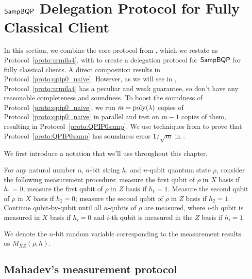\section{$\operatorname{\mathsf{SampBQP}}$ Delegation Protocol for Fully Classical Client}
\label{sec:qpip0_all}

In this section, we combine the core protocol from \cite{FOCS:Mahadev18a}, which we restate as Protocol~\ref{proto:urmila4}, with  to create a delegation protocol for $\operatorname{\mathsf{SampBQP}}$ for fully classical clients. A direct composition results in Protocol~\ref{proto:qpip0_naive}. However, as we will see in , Protocol~\ref{proto:urmila4} has a peculiar and weak guarantee, so  don't have any reasonable completeness and soundness. To boost the soundness of Protocol~\ref{proto:qpip0_naive}, we run $m=\operatorname*{\operatorname{poly}}(\lambda)$ copies of Protocol~\ref{proto:qpip0_naive} in parallel and test on $m-1$ copies of them, resulting in Protocol~\ref{proto:QPIP0samp}. We use techniques from \cite{arXiv:ChiaChungYam19} to prove that Protocol~\ref{proto:QPIP0samp} has soundness error $1/\sqrt{m}$ in .

We first introduce a notation that we'll use throughout this chapter.
\begin{definition}[$M_{XZ}(\rho,h)$]
	For any natural number $n$, $n$-bit string $h$, and $n$-qubit quantum state $\rho$, consider the following measurement procedure: measure the first qubit of $\rho$ in $X$ basis if $h_1=0$; measure the first qubit of $\rho$ in $Z$ basis if $h_1=1$.  Measure the second qubit of $\rho$ in $X$ basis if $h_2=0$; measure the second qubit of $\rho$ in $Z$ basis if $h_2=1$. Continue qubit-by-qubit until all $n$-qubits of $\rho$ are measured, where $i$-th qubit is measured in $X$ basis if $h_i=0$ and  $i$-th qubit is measured in the $Z$ basis if $h_i=1$.

	We denote the $n$-bit random variable corresponding to the measurement results as $M_{XZ}(\rho,h)$.
\end{definition}

\subsection{Mahadev's measurement protocol}\label{sec:urmila4}

